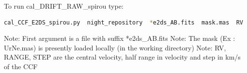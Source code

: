 To run cal\_DRIFT\_RAW\_spirou type:
\begin{lstlisting}[language=bash, style=bashstyle]
cal_CCF_E2DS_spirou.py  night_repository  *e2ds_AB.fits  mask.mas  RV  RANGE  STEP 
\end{lstlisting}

\noindent Note: First argument is a file with suffix *e2ds\_AB.fits
\noindent Note: The mask (Ex : UrNe.mas) is presently loaded locally (in the working directory) 
\noindent Note: RV, RANGE, STEP are the central velocity, half range in velocity and step in km/s of the CCF 













